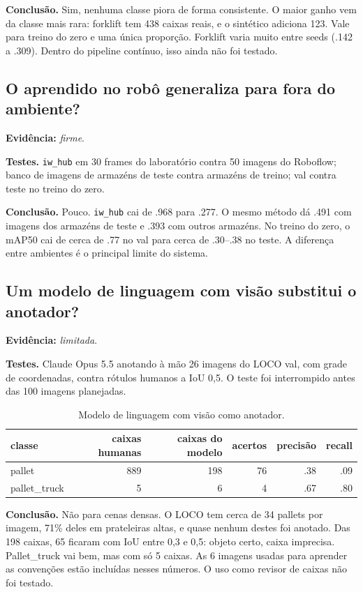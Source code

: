 \documentclass[11pt,a4paper]{article}
\newcommand{\evidencia}[1]{\noindent\textbf{Evidência:} \emph{#1}.\par}
\newcommand{\testes}{\noindent\textbf{Testes.} }
\newcommand{\conclusao}{\noindent\textbf{Conclusão.} }
\begin{document}
\conclusao Sim, nenhuma classe piora de forma consistente. O maior ganho vem da
classe mais rara: forklift tem 438 caixas reais, e o sintético adiciona 123. Vale
para treino do zero e uma única proporção. Forklift varia muito entre seeds (.142
a .309). Dentro do pipeline contínuo, isso ainda não foi testado.

\subsection{O aprendido no robô generaliza para fora do ambiente?}
\evidencia{firme}

\testes \texttt{iw\_hub} em 30 frames do laboratório contra 50 imagens do Roboflow;
banco de imagens de armazéns de teste contra armazéns de treino; val contra teste
no treino do zero.

\conclusao Pouco. \texttt{iw\_hub} cai de .968 para .277. O mesmo método dá .491
com imagens dos armazéns de teste e .393 com outros armazéns. No treino do zero,
o mAP50 cai de cerca de .77 no val para cerca de .30--.38 no teste. A diferença
entre ambientes é o principal limite do sistema.

\subsection{Um modelo de linguagem com visão substitui o anotador?}
\evidencia{limitada}

\testes Claude Opus 5.5 anotando à mão 26 imagens do LOCO val, com grade de
coordenadas, contra rótulos humanos a IoU 0,5. O teste foi interrompido antes das
100 imagens planejadas.

\begin{table}[H]
\centering\small
\caption{Modelo de linguagem com visão como anotador.}
\begin{tabular}{lrrrrr}
\toprule
classe & caixas humanas & caixas do modelo & acertos & precisão & recall \\
\midrule
pallet & 889 & 198 & 76 & .38 & .09 \\
pallet\_truck & 5 & 6 & 4 & .67 & .80 \\
\bottomrule
\end{tabular}
\end{table}

\conclusao Não para cenas densas. O LOCO tem cerca de 34 pallets por imagem, 71\%
deles em prateleiras altas, e quase nenhum destes foi anotado. Das 198 caixas, 65
ficaram com IoU entre 0,3 e 0,5: objeto certo, caixa imprecisa. Pallet\_truck vai
bem, mas com só 5 caixas. As 6 imagens usadas para aprender as convenções estão
incluídas nesses números. O uso como revisor de caixas não foi testado.
\end{document}
